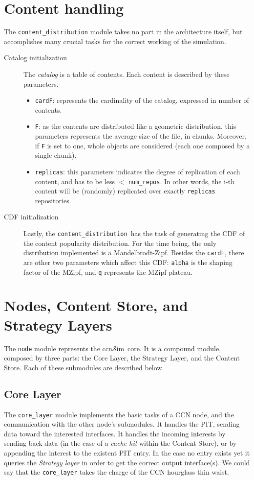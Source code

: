\documentclass{book}
\newcommand{\ccnsim}{ccn$\mathcal{S}$im}
\newcommand{\content}{\texttt{content\_distribution}}
\begin{document}
\section{Content handling}
The \verb|content_distribution| module takes no part in the architecture itself, but accomplishes many crucial tasks for the correct working of the simulation. 
\begin{description}
    \item[Catalog initialization] The \emph{catalog} is a table of contents. Each content is described by these parameters.
	\begin{itemize}
	    \item \verb|cardF|: represents the cardinality of the catalog, expressed in number of contents. 
	    \item \verb|F|: as the contents are distributed like a geometric distribution, this parameters represents the average size of the file, in chunks. Moreover, if \verb|F| is set to one, whole objects are considered (each one composed by a single chunk).
	    \item \verb|replicas|: this parameters indicates the degree of replication of each content, and has to be less $<$ \verb|num_repos|. In other words, the i-th content will be (randomly) replicated over exactly \verb|replicas| repositories.
	\end{itemize}
    \item[CDF initialization] Lastly, the \content\ has the task of generating the CDF of the content popularity distribution. For the time being, the only distribution implemented is a Mandelbrodt-Zipf. Besides the \verb|cardF|, there are other two parameters which affect this CDF: \verb|alpha| is the shaping factor of the MZipf, and \verb|q| represents the MZipf plateau.
\end{description}

\section{Nodes, Content Store, and Strategy Layers}
The \verb|node| module represents the \ccnsim\ core. It is a compound module, composed by three parts: the Core Layer, the Strategy Layer, and the Content Store. Each of these submodules are  described below. 
\subsection{Core Layer} 
The \verb|core_layer| module implements the basic tasks of a CCN node, and the communication with the other node's submodules. It handles the PIT, sending data toward the interested interfaces. It handles the incoming interests by sending back data (in the case of a \emph{cache hit} within the Content Store), or by  appending the interest to the existent PIT entry. In the case no entry exists yet it queries the \emph{Strategy layer} in order to get the correct output interface(s). We could say that the \verb|core_layer| takes the charge of the CCN hourglass  thin waist.
\end{document}

